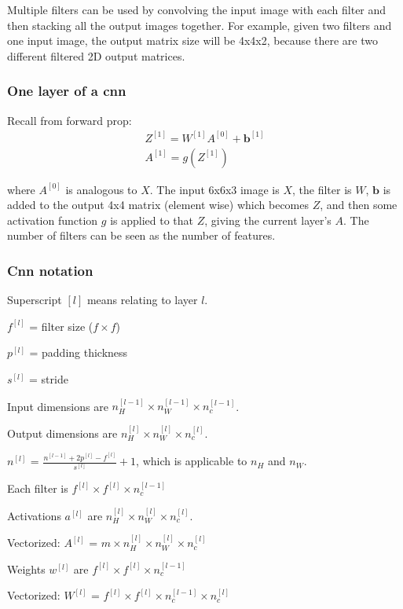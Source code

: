 \documentclass[12pt]{article}
\begin{document}
Multiple filters can be used by convolving the input image with each filter and then stacking
all the output images together. For example, given two filters and one input image,
the output matrix size will be 4x4x2, because there are two different filtered 2D output
matrices.

\subsubsection{One layer of a cnn}

Recall from forward prop:
\begin{gather*}
    Z^{[1]} = W^{[1]} A^{[0]} + \bm b^{[1]}\\
    A^{[1]} = g(Z^{[1]})
\end{gather*}

where $A^{[0]}$ is analogous to $X$. The input 6x6x3 image is $X$, the filter is $W$,
$\bm b$ is added to the output 4x4 matrix (element wise) which becomes $Z$, and then some
activation function $g$ is applied to that $Z$, giving the current layer's $A$. The number
of filters can be seen as the number of features.

\subsubsection{Cnn notation}

Superscript $[l]$ means relating to layer $l$.

$f^{[l]}$ = filter size ($f \times f$)

$p^{[l]}$ = padding thickness

$s^{[l]}$ = stride

Input dimensions are $n_H^{[l-1]} \times n_W^{[l-1]} \times n_c^{[l-1]}$.

Output dimensions are $n_H^{[l]} \times n_W^{[l]} \times n_c^{[l]}$.

$n^{[l]}$ = $\frac{n^{[l-1]}+2p^{[l]}-f^{[l]}}{s^{[l]}} + 1$, which is applicable to $n_H$ and $n_W$.

Each filter is $f^{[l]} \times f^{[l]} \times n_c^{[l-1]}$

Activations $a^{[l]}$ are $n_H^{[l]} \times n_W^{[l]} \times n_c^{[l]}$.

Vectorized: $A^{[l]}$ = $m \times n_H^{[l]} \times n_W^{[l]} \times n_c^{[l]}$

Weights $w^{[l]}$ are $f^{[l]} \times f^{[l]} \times n_c^{[l-1]}$

Vectorized: $W^{[l]}$ = $f^{[l]} \times f^{[l]} \times n_c^{[l-1]} \times n_c^{[l]}$
\end{document}
